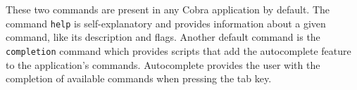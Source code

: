 These two commands are present in any Cobra application by default. The command \texttt{help} is self-explanatory and provides information about a given command, like its description and flags. Another default command is the \texttt{completion} command which provides scripts that add the autocomplete feature to the application's commands. Autocomplete provides the user with the completion of available commands when pressing the tab key.
